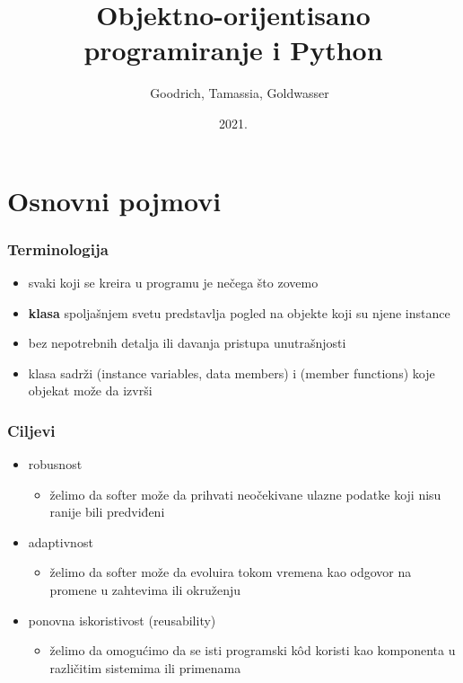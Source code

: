 \documentclass[compress,aspectratio=169]{beamer}
\title{Objektno-orijentisano programiranje i Python}
\author{\textcopyright \ \ Goodrich, Tamassia, Goldwasser}
\institute{Katedra za informatiku, Fakultet tehničkih nauka, Univerzitet u
Novom Sadu}
\date{2021.}
\begin{document}
\frame{\titlepage}

\section[Osnovni pojmovi]{Osnovni pojmovi}
\begin{frame}[fragile]
  \frametitle{Terminologija}
  \begin{itemize}
    \item svaki  koji se kreira u programu je  nečega što zovemo 
    \item \textbf{klasa} spoljašnjem svetu predstavlja pogled na objekte koji su njene instance
    \item bez nepotrebnih detalja ili davanja pristupa unutrašnjosti
    \item klasa sadrži  (instance variables, data members) i  (member functions) koje objekat može da izvrši 
  \end{itemize}
\end{frame}

\begin{frame}[fragile]
  \frametitle{Ciljevi}
  \begin{itemize}
    \item robusnost
    \begin{itemize}
      \item želimo da softer može da prihvati neočekivane ulazne podatke koji nisu ranije bili predviđeni
    \end{itemize}
    \item adaptivnost
    \begin{itemize}
      \item želimo da softer može da evoluira tokom vremena kao odgovor na promene u zahtevima ili okruženju
    \end{itemize}
    \item ponovna iskoristivost (reusability)
    \begin{itemize}
      \item želimo da omogućimo da se isti programski kôd koristi kao komponenta u različitim sistemima ili primenama
    \end{itemize}
  \end{itemize}
\end{frame}
\end{document}
